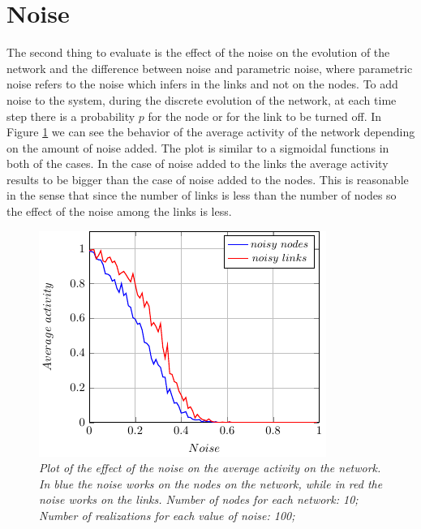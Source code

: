 \section{Noise}
The second thing to evaluate is the effect of the noise on the evolution of the network and the difference between noise and parametric noise, where parametric noise refers to the noise which infers in the links and not on the nodes.
To add noise to the system, during the discrete evolution of the network, at each time step there is a probability $p$ for the node or for the link to be turned off.
In Figure \ref{fig:noise} we can see the behavior of the average activity of the network depending on the amount of noise added. The plot is similar to a sigmoidal functions in both of the cases. In the case of noise added to the links the average activity results to be bigger than the case of noise added to the nodes. This is reasonable in the sense that since the number of links is less than the number of nodes so the effect of the noise among the links is less.
\begin{figure}[h]
\centering
\includegraphics[scale=1.5]{images/noise.pdf}
\caption{\emph{Plot of the effect of the noise on the average activity on the network. In blue the noise works on the nodes on the network, while in red the noise works on the links. Number of nodes for each network: 10; Number of realizations for each value of noise: 100; }}
\label{fig:noise}
\end{figure}


